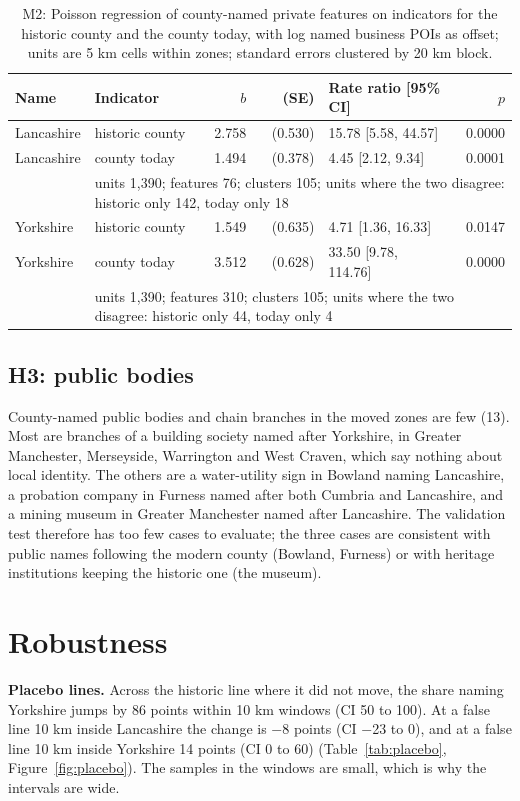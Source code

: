 \documentclass[11pt,a4paper]{article}
\begin{document}
\begin{table}[tbp]\centering\footnotesize\caption{M2: Poisson regression of county-named private features on indicators for the historic county and the county today, with log named business POIs as offset; units are 5 km cells within zones; standard errors clustered by 20 km block.}\label{tab:m2}\begin{tabular}{llrrlr}\toprule Name & Indicator & $b$ & (SE) & Rate ratio [95\% CI] & $p$\\\midrule
Lancashire & historic county & 2.758 & (0.530) & 15.78 [5.58, 44.57] & 0.0000\\
Lancashire & county today & 1.494 & (0.378) & 4.45 [2.12, 9.34] & 0.0001\\
& \multicolumn{5}{p{11cm}}{units 1,390; features 76; clusters 105; units where the two disagree: historic only 142, today only 18}\\\midrule
Yorkshire & historic county & 1.549 & (0.635) & 4.71 [1.36, 16.33] & 0.0147\\
Yorkshire & county today & 3.512 & (0.628) & 33.50 [9.78, 114.76] & 0.0000\\
& \multicolumn{5}{p{11cm}}{units 1,390; features 310; clusters 105; units where the two disagree: historic only 44, today only 4}\\\bottomrule\end{tabular}\end{table}

\subsection{H3: public bodies}
County-named public bodies and chain branches in the moved zones are few (13). Most are branches of a building society named after Yorkshire, in Greater Manchester, Merseyside, Warrington and West Craven, which say nothing about local identity. The others are a water-utility sign in Bowland naming Lancashire, a probation company in Furness named after both Cumbria and Lancashire, and a mining museum in Greater Manchester named after Lancashire. The validation test therefore has too few cases to evaluate; the three cases are consistent with public names following the modern county (Bowland, Furness) or with heritage institutions keeping the historic one (the museum).

\section{Robustness}\label{sec:robust}
\textbf{Placebo lines.} Across the historic line where it did not move, the share naming Yorkshire jumps by 86 points within 10 km windows (CI 50 to 100). At a false line 10 km inside Lancashire the change is $-$8 points (CI $-$23 to 0), and at a false line 10 km inside Yorkshire 14 points (CI 0 to 60) (Table~\ref{tab:placebo}, Figure~\ref{fig:placebo}). The samples in the windows are small, which is why the intervals are wide.
\end{document}
